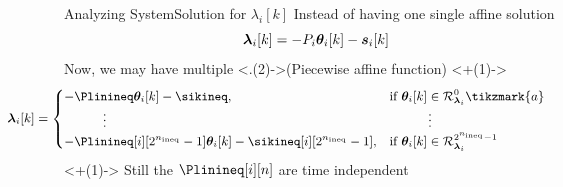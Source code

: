 \documentclass[aspectratio=169]{beamer}
\begin{document}
\begin{frame}{Analyzing System}{Solution for $\lambda_{i}[k]$}
  \centering
  Instead of having one single affine solution
  \begin{equation*}
    \lambdaik=-\Plin\thetaik-\sik
  \end{equation*}
  \pause
  Now, we may have multiple \onslide<.(2)->{(Piecewise affine function)}
  \onslide<+(1)->{
    \begin{equation*}
      \small
      \hspace{-2cm}
      \begin{aligned}
        \lambdaik=
        \begin{cases}
          {-\Plinineq\thetaik-\sikineq},&\text{if}\ \thetaik \in\set{R}_{\lambdai}^{0}\tikzmark{a}\\
          \qquad\quad \vdots&\qquad\quad \vdots\\
          -\Plinineq[i][2^{\nineq}-1]\thetaik-\sikineq[i][2^{\nineq}-1],&\text{if}\ \thetaik \in\set{R}_{\lambdai}^{2^{\nineq}-1}\\
        \end{cases}
      \end{aligned}
    \end{equation*}
  }
  \onslide<+(1)->{
    \alert<+>{Still the $\Plinineq[i][n]$ are time independent}
  }


\end{frame}
\end{document}
